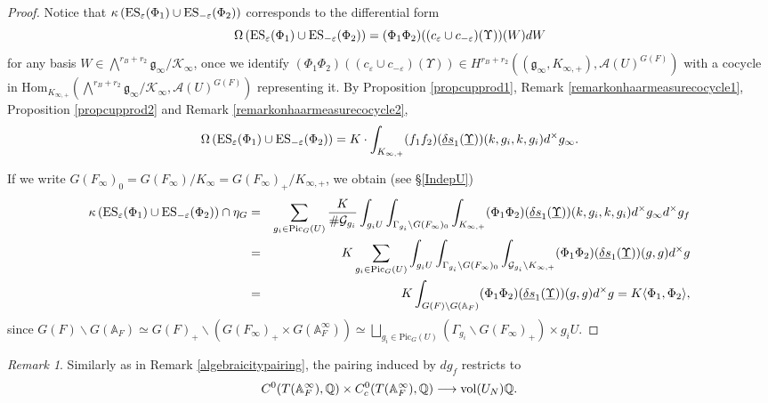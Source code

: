 \documentclass{amsart}
\theoremstyle{definition}
\theoremstyle{remark}
\newtheorem{remark}[theorem]{Remark}
\numberwithin{equation}{section}
\newcommand{\Pic}{\mathrm{Pic}}
\newcommand{\A}{{\mathbb A}}
\newcommand{\Q}{{\mathbb Q}}
\newcommand{\cA}{{\mathcal A}}
\newcommand{\cK}{{\mathcal K}}
\newcommand{\cG}{{\mathcal G}}
\newcommand{\Hom}{{\mathrm {Hom}}}
\begin{document}
\begin{proof}
Notice that $\kappa\left({\rm ES}_\varepsilon(\Phi_1)\cup {\rm ES}_{-\varepsilon}(\Phi_2)\right)$ corresponds to the differential form
\[
\Omega\left({\rm ES}_\varepsilon(\Phi_1)\cup {\rm ES}_{-\varepsilon}(\Phi_2)\right)=(\Phi_1\Phi_2)((c_\varepsilon\cup c_{-\varepsilon})(\Upsilon))(W)dW
\]
for any basis $W\in \bigwedge^{r_B+r_2}\mathfrak{g}_\infty/\cK_\infty$, once we identify $(\Phi_1\Phi_2)((c_\varepsilon\cup c_{-\varepsilon})(\Upsilon))\in H^{r_B+r_2}((\mathfrak{g}_\infty,K_{\infty,+}),\cA(U)^{G(F)})$ with a cocycle in $\Hom_{K_{\infty,+}}(\bigwedge^{r_B+r_2}\mathfrak{g}_\infty/\cK_\infty,\cA(U)^{G(F)})$ representing it. By Proposition \ref{propcupprod1}, Remark \ref{remarkonhaarmeasurecocycle1}, Proposition \ref{propcupprod2} and Remark \ref{remarkonhaarmeasurecocycle2},
\[
\Omega\left({\rm ES}_\varepsilon(\Phi_1)\cup {\rm ES}_{-\varepsilon}(\Phi_2)\right)=K\cdot \int_{K_{\infty,+}}(f_1f_2)(\underline{\delta s}_1(\underline \Upsilon))(k,g_i,k,g_i)d^\times g_\infty.
\]


 If we write $G(F_\infty)_0=G(F_\infty)/K_\infty=G(F_\infty)_+/K_{\infty,+}$, we obtain (see \S \ref{IndepU}) 
    \begin{eqnarray*}
    \kappa\left({\rm ES}_\varepsilon(\Phi_1)\cup {\rm ES}_{-\varepsilon}(\Phi_2)\right)\cap\eta_G&=&\sum_{g_i\in {\rm Pic}_G(U)}\frac{K}{\#\cG_{g_i}}\int_{g_iU}\int_{\Gamma_{g_i}\backslash G(F_\infty)_0}\int_{K_{\infty,+}}(\Phi_1\Phi_2)(\underline{\delta s}_1(\underline \Upsilon))(k,g_i,k,g_i)d^\times g_\infty d^\times g_f\\
    &=&K\sum_{g_i\in {\rm Pic}_G(U)}\int_{g_iU}\int_{\Gamma_{g_i}\backslash G(F_\infty)_0}\int_{\cG_{g_i}\backslash K_{\infty,+}}(\Phi_1\Phi_2)(\underline{\delta s}_1(\underline \Upsilon))(g,g)d^\times g\\
    &=&K\int_{G(F)\backslash G(\A_F)}(\Phi_1\Phi_2)(\underline{\delta s}_1(\underline \Upsilon))(g,g)d^\times g=K\langle \Phi_1, \Phi_2\rangle,
    \end{eqnarray*}
    since $G(F)\backslash G(\A_F)\simeq G(F)_+\backslash (G(F_\infty)_+\times G(\A^\infty_F))\simeq\bigsqcup_{g_i\in \Pic_G(U)}(\Gamma_{g_i}\backslash G(F_\infty)_+)\times g_iU$.
\end{proof}
\begin{remark}
    Similarly as in Remark \ref{algebraicitypairing}, the pairing induced by $dg_f$ restricts to
    \[
    C^0(T(\A_F^\infty),\Q)\times C_c^0(T(\A_F^\infty),\Q)\longrightarrow {\rm vol}(U_N)\Q.
    \]
\end{remark}
\end{document}
